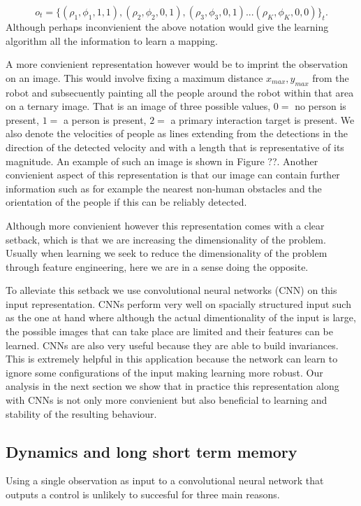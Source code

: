 \documentclass[letterpaper, 10 pt, conference]{ieeeconf}
\begin{document}
\begin{equation}
 	o_t = \{(\rho_1,\phi_1,1,1), (\rho_2,\phi_2,0,1),(\rho_3,\phi_3,0,1) ... (\rho_{K},\phi_{K},0,0)\}_t.
\end{equation}
Although perhaps inconvienient the above notation would give the learning algorithm all the information to learn a mapping. 

A more convienient representation however would be to imprint the observation on an image. This would involve fixing a maximum distance $x_{max},y_{max}$ from the robot and subsecuently painting all the people around the robot within that area on a ternary image. That is an image of three possible values, $0=$ no person is present, $1=$ a person is present, $2=$ a primary interaction target is present. We also denote the velocities of people as lines extending from the detections in the direction of the detected velocity and with a length that is representative of its magnitude. An example of such an image is shown in Figure ??. Another convienient aspect of this representation is that our image can contain further information such as for example the nearest non-human obstacles and the orientation of the people if this can be reliably detected. 

Although more convienient however this representation comes with a clear setback, which is that we are increasing the dimensionality of the problem. Usually when learning we seek to reduce the dimensionality of the problem through feature engineering, here we are in a sense doing the opposite. 

To alleviate this setback we use convolutional neural networks (CNN) on this input representation. CNNs perform very well on spacially structured input such as the one at hand where although the actual dimentionality of the input is large, the possible images that can take place are limited and their features can be learned. CNNs are also very useful because they are able to build invariances. This is extremely helpful in this application because the network can learn to ignore some configurations of the input making learning more robust. Our analysis in the next section we show that in practice this representation along with CNNs is not only more convienient but also beneficial to learning and stability of the resulting behaviour.

\subsection{Dynamics and long short term memory}
Using a single observation as input to a convolutional neural network that outputs a control is unlikely to succesful for three main reasons.
\end{document}
